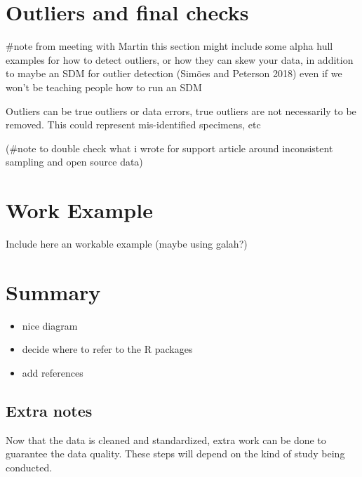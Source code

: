 \documentclass[
  letterpaper,
  DIV=11,
  numbers=noendperiod,
  oneside]{scrreprt}
\providecommand{\tightlist}{%
  \setlength{\itemsep}{0pt}\setlength{\parskip}{0pt}}\usepackage{longtable,booktabs,array}
\begin{document}

\hypertarget{outliers-and-final-checks}{%
\chapter{Outliers and final checks}\label{outliers-and-final-checks}}

\#note from meeting with Martin this section might include some alpha
hull examples for how to detect outliers, or how they can skew your
data, in addition to maybe an SDM for outlier detection (Simões and
Peterson 2018) even if we won't be teaching people how to run an SDM

Outliers can be true outliers or data errors, true outliers are not
necessarily to be removed. This could represent mis-identified
specimens, etc

(\#note to double check what i wrote for support article around
inconsistent sampling and open source data)


\hypertarget{work-example}{%
\chapter{Work Example}\label{work-example}}

Include here an workable example (maybe using galah?)


\hypertarget{summary}{%
\chapter{Summary}\label{summary}}

\begin{itemize}
\tightlist
\item
  nice diagram
\item
  decide where to refer to the R packages
\item
  add references
\end{itemize}

\hypertarget{extra-notes}{%
\section{Extra notes}\label{extra-notes}}

Now that the data is cleaned and standardized, extra work can be done to
guarantee the data quality. These steps will depend on the kind of study
being conducted.
\end{document}
